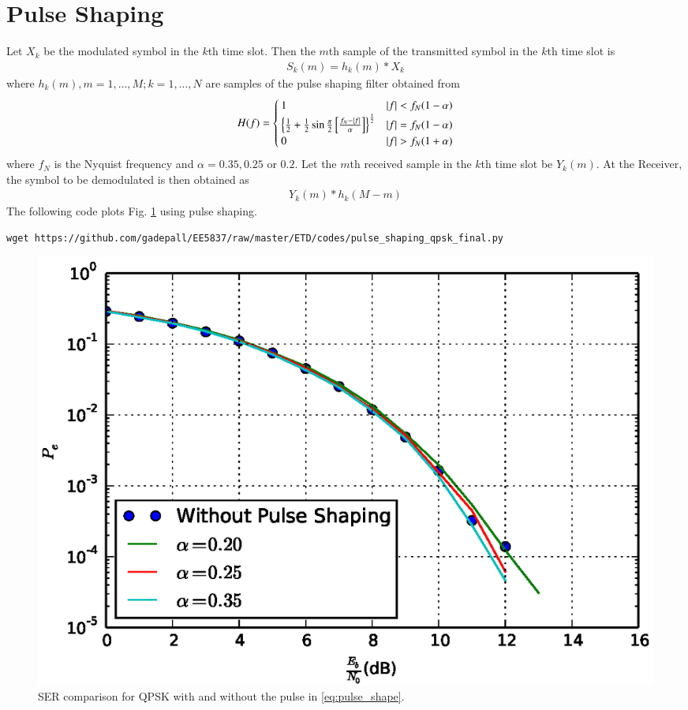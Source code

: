 \documentclass[journal,12pt,twocolumn]{IEEEtran}
\begin{document}
\section{Pulse Shaping}
Let $X_k$ be the modulated symbol in the $k$th time slot.  Then the $m$th sample of the transmitted symbol in the $k$th time slot is
\begin{align}
S_k(m)=h_k(m)* X_k
\end{align}
where $h_k(m), m=1,\dots, M; k=1,\dots,N$ are samples of the pulse shaping filter \cite{dvb}  obtained from
\begin{align}
H(f) =\begin{cases}
1& \left\vert f\right\vert<f_N(1-\alpha)\\
\left\{\frac{1}{2}+\frac{1}{2}\sin \frac{\pi}{2}{}\left[\frac{f_N-\left\vert f\right\vert}{\alpha}\right]\right\}^{\frac{1}{2}}&\left\vert f\right\vert=f_N(1-\alpha)\\
0&\left\vert f\right\vert>f_N(1+\alpha)
\end{cases}
\label{eq:pulse_shape}
\end{align}
%
where $f_N$ is the Nyquist frequency and $\alpha = 0.35, 0.25$ or $0.2$.
Let the $m$th received sample in the  $k$th time slot be $Y_k(m)$. At the Receiver, the symbol to be demodulated is then obtained as
\begin{align}
Y_k(m)*h_k(M-m)
\end{align}
The following code plots Fig. \ref{fig:pulseshaping} using pulse shaping.
\begin{lstlisting}
wget https://github.com/gadepall/EE5837/raw/master/ETD/codes/pulse_shaping_qpsk_final.py
\end{lstlisting}
\begin{figure}[!ht]
\begin{center}
\includegraphics[width=\columnwidth]{./figs/pulseshaping}
\end{center}
\caption{SER comparison for QPSK with and without the pulse in \eqref{eq:pulse_shape}.}
\label{fig:pulseshaping}
\end{figure}
\end{document}
